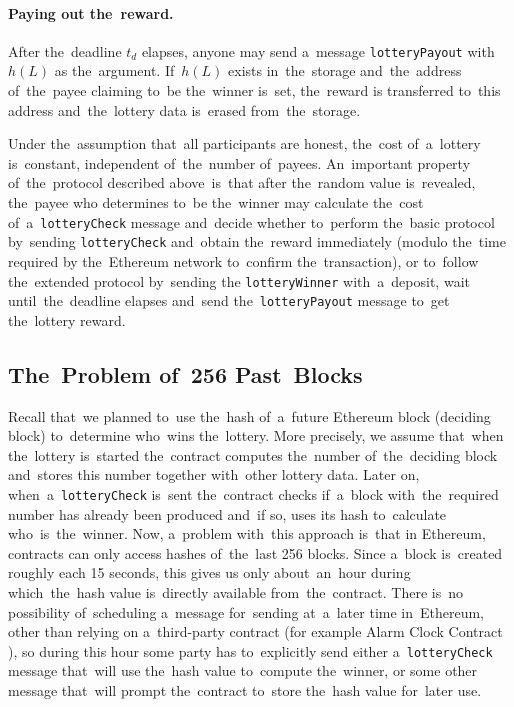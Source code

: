 \documentclass[a4paper]{article}
\newcommand{\lotteryhash}[1]{h({#1})}
\begin{document}
    \paragraph{Paying out the~reward.}
    After the~deadline $t_d$ elapses, anyone may send a~message \texttt{lotteryPayout} with~$\lotteryhash{L}$ as the~argument.
    If~$\lotteryhash{L}$ exists in~the~storage and~the~address of~the~payee claiming to~be the~winner is~set, the~reward is
    transferred to~this address and~the~lottery data is~erased from~the~storage.

    Under the~assumption that~all participants are honest, the~cost of~a~lottery is~constant, independent of~the~number
    of~payees.
    An~important property of~the~protocol described above~is~that after the~random value is~revealed, the~payee who
    determines to~be the~winner may calculate the~cost of~a~\texttt{lotteryCheck} message and~decide whether to~perform
    the~basic protocol by~sending \texttt{lotteryCheck} and~obtain the~reward immediately (modulo the~time required by
    the~Ethereum network to~confirm the~transaction), or to~follow the~extended protocol by~sending the
    \texttt{lotteryWinner} with~a~deposit, wait until~the~deadline elapses and~send the~\texttt{lotteryPayout} message
    to~get the~lottery reward.
    
\subsection{The~Problem of~256 Past~Blocks}
    \label{sec:problem256}
    Recall that~we planned to~use the~hash of~a~future Ethereum block (deciding block) to~determine who~wins
    the~lottery. More precisely, we assume that~when the~lottery is~started the~contract computes the~number
    of~the~deciding block and~stores this number together with~other lottery data. Later on,
    when~a~\texttt{lotteryCheck} is~sent the~contract checks if~a~block with~the~required number has already been
    produced and~if so, uses its hash to~calculate who~is~the~winner. Now, a~problem with~this approach is~that in
    Ethereum, contracts can only access hashes of~the~last 256 blocks. Since a~block is~created roughly each 15
    seconds, this gives us only about~an~hour during which~the~hash value is~directly available from~the~contract.
    There is~no possibility of~scheduling a~message for~sending at~a~later time in~Ethereum, other than relying on
    a~third-party contract (for example Alarm Clock Contract \cite{ALARM}), so during this hour some party has
    to~explicitly send either a~\texttt{lotteryCheck} message that~will use the~hash value to~compute the~winner,
    or some other message that~will prompt the~contract to~store the~hash value for~later use.
\end{document}
